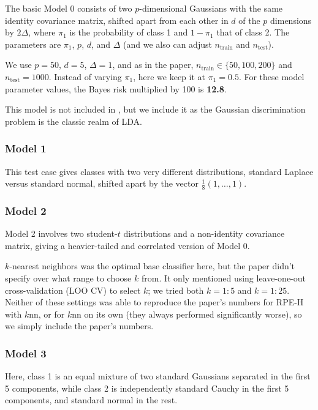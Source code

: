 \documentclass{amsart}
\begin{document}
The basic Model 0 consists of two $p$-dimensional Gaussians with the
same identity covariance matrix, shifted apart from each other in
$d$ of the $p$ dimensions by $2\Delta$, where $\pi_{1}$ is the
probability of class 1 and $1-\pi_{1}$ that of class 2. The parameters
are $\pi_{1}$, $p$, $d$, and $\Delta$ (and we also can adjust
$n_{\mathrm{train}}$ and $n_{\mathrm{test}}$).

We use $p=50$, $d=5$, $\Delta=1$, and as in the paper, $n_{\mathrm{train}}\in\{50,100,200\}$
and $n_{\mathrm{test}}=1000$. Instead of varying $\pi_{1}$, here
we keep it at $\pi_{1}=0.5$. For these model parameter values, the Bayes risk multiplied by 100
is \textbf{12.8}.

This model is not included in \cite{CS15}, but we include it as the Gaussian discrimination problem is
the classic realm of LDA.

\subsubsection{Model 1}

This test case gives classes with two very different distributions, standard Laplace versus standard normal, shifted apart by the vector
$\frac{1}{8}(1,\dots,1)$.


\subsubsection{Model 2}

Model 2 involves two student-$t$ distributions and a non-identity covariance matrix, giving a heavier-tailed and correlated version of Model 0.

$k$-nearest neighbors was the optimal base classifier here, but the
paper didn't specify over what range to choose $k$ from. It only
mentioned using leave-one-out cross-validation (LOO CV) to select
$k$; we tried both $k=1:5$ and $k=1:25$. Neither of these settings
was able to reproduce the paper's numbers for RPE-H with $k$nn, or
for $k$nn on its own (they always performed significantly worse),
so we simply include the paper's numbers.

\subsubsection{Model 3}

Here, class 1 is an equal mixture of two standard Gaussians separated in
the first 5 components, while class 2 is independently standard Cauchy in
the first 5 components, and standard normal in the rest.
\end{document}
